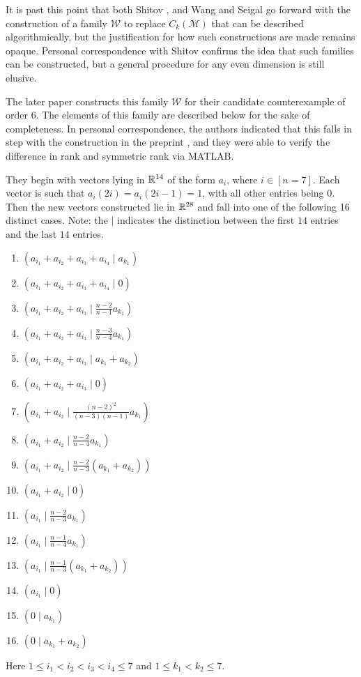 \documentclass[../Lael_John_MasterThesis_Draft.tex]{subfiles}
\begin{document}
It is past this point that both Shitov \cite{shitov_comons_2020}, and Wang and Seigal \cite{wang_lower_2023} go forward with the construction of a family $\mathcal{W}$ to replace $C_k(\mathcal{M})$ that can be described algorithmically, but the justification for how such constructions are made remains opaque. Personal correspondence with Shitov confirms the idea that such families can be constructed, but a general procedure for any even dimension is still elusive.

The later paper \cite{wang_lower_2023} constructs this family $\mathcal{W}$ for their candidate counterexample of order $6$. The elements of this family are described below for the sake of completeness. In personal correspondence, the authors indicated that this falls in step with the construction in the preprint \cite{shitov_comons_2020}, and they were able to verify the difference in rank and symmetric rank via MATLAB.

They begin with vectors lying in $\mathbb{R}^{14}$ of the form $a_i$, where $i \in [n=7]$. Each vector is such that $a_i(2i) = a_i(2i - 1) = 1$, with all other entries being $0$. Then the new vectors constructed lie in $\mathbb{R}^{28}$ and fall into one of the following 16 distinct cases. Note: the $|$ indicates the distinction between the first $14$ entries and the last $14$ entries. \begin{enumerate}
    \item $(a_{i_1} + a_{i_2} + a_{i_3} + a_{i_4} \;|\; a_{k_1})$
    \item $(a_{i_1} + a_{i_2} + a_{i_3} + a_{i_4} \;|\; 0)$
    \item $(a_{i_1} + a_{i_2} + a_{i_3} \;|\; \frac{n-2}{n-1}a_{k_1})$
    \item $(a_{i_1} + a_{i_2} + a_{i_3} \;|\; \frac{n-3}{n-4}a_{k_1})$
    \item $(a_{i_1} + a_{i_2} + a_{i_3} \;|\; a_{k_1} + a_{k_2})$
    \item $(a_{i_1} + a_{i_2} + a_{i_3} \;|\; 0)$
    \item $(a_{i_1} + a_{i_2} \;|\; \frac{(n-2)^2}{(n-3)(n-1)}a_{k_1})$
    \item $(a_{i_1} + a_{i_2} \;|\; \frac{n-2}{n-4}a_{k_1})$
    \item $(a_{i_1} + a_{i_2} \;|\; \frac{n-2}{n-3}(a_{k_1} + a_{k_2}))$
    \item $(a_{i_1} + a_{i_2} \;|\; 0)$
    \item $(a_{i_1} \;|\; \frac{n-2}{n-3}a_{k_1})$
    \item $(a_{i_1} \;|\; \frac{n-1}{n-4}a_{k_1})$
    \item $(a_{i_1} \;|\; \frac{n-1}{n-3}(a_{k_1} + a_{k_2}))$
    \item $(a_{i_1} \;|\; 0)$
    \item $(0 \;|\; a_{k_1})$
    \item $(0 \;|\; a_{k_1} + a_{k_2})$
\end{enumerate}Here $1 \leq i_1 < i_2 < i_3 < i_4 \leq 7$ and $1 \leq k_1 < k_2 \leq 7$.
\end{document}
